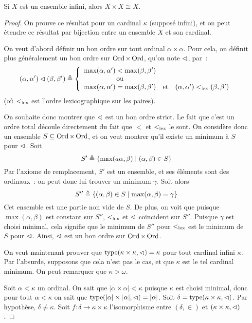 \begin{theorem}
  Si $X$ est un ensemble infini, alors $X\times X \cong X$.
\end{theorem}

\begin{proof}
  On prouve ce résultat pour un cardinal $\kappa$ (supposé infini), et on peut
  étendre ce résultat par bijection entre un ensemble $X$ et son cardinal.

  On veut d'abord définir un bon ordre sur tout ordinal $\alpha \times \alpha$.
  Pour cela, on définit plus généralement un bon ordre sur $\operatorname{Ord}\times\operatorname{Ord}$,
  qu'on note $\lhd$, par~:
  \[(\alpha,\alpha')\lhd(\beta,\beta') \triangleq
  \left\{\begin{array}{ccc}
  \max(\alpha,\alpha') < \max(\beta,\beta') & &\\
  \text{ou} & &\\
  \max(\alpha,\alpha') = \max(\beta,\beta')&\text{et}&
  (\alpha,\alpha')<_{\mathrm{lex}} (\beta,\beta')
  \end{array}\right.\]
  (où $<_{\mathrm{lex}}$ est l'ordre lexicographique sur les paires).

  On souhaite donc montrer que $\lhd$ est un bon ordre strict. Le fait que
  c'est un ordre total découle directement du fait que $<$ et $<_{\mathrm{lex}}$ le sont.
  On considère donc un ensemble $S\subseteq \operatorname{Ord}\times \operatorname{Ord}$, et on veut montrer
  qu'il existe un minimum à $S$ pour $\lhd$. Soit
  \[S'\triangleq \{\max(a\alpha,\beta)\mid (\alpha,\beta) \in S\}\]
  Par l'axiome de remplacement, $S'$ est un ensemble, et ses éléments sont des
  ordinaux~: on peut donc lui trouver un minimum $\gamma$. Soit alors
  \[S'' \triangleq \{(\alpha,\beta) \in S\mid \max(\alpha,\beta) = \gamma\}\]
  Cet ensemble est une partie non vide de $S$. De plus, on voit que puisque
  $\max(\alpha,\beta)$ est constant sur $S''$, $<_{\mathrm{lex}}$ et $\lhd$ coïncident
  sur $S''$. Puisque $\gamma$ est choisi minimal, cela signifie que le minimum
  de $S''$ pour $<_{\mathrm{lex}}$ est le minimum de $S$ pour $\lhd$. Ainsi, $\lhd$
  est un bon ordre sur $\operatorname{Ord}\times \operatorname{Ord}$.

  On veut maintenant prouver que $\operatorname{type}(\kappa\times\kappa,\lhd) = \kappa$
  pour tout cardinal infini $\kappa$. Par l'absurde, supposons que cela n'est
  pas le cas, et que $\kappa$ est le tel cardinal minimum. On peut remarquer que
  $\kappa > \omega$.

  Soit $\alpha < \kappa$ un ordinal. On sait que
  $|\alpha \times \alpha| < \kappa$ puisque $\kappa$ est choisi minimal, donc
  pour tout $\alpha < \kappa$ on sait que
  $\operatorname{type}(|\alpha| \times |\alpha|,\lhd) = |\alpha|$. Soit
  $\delta = \operatorname{type}(\kappa\times\kappa,\lhd)$. Par hypothèse,
  $\delta \neq \kappa$. Soit $f : \delta \to \kappa \times \kappa$
  l'isomorphisme entre $(\delta,\in)$ et $(\kappa\times\kappa,\lhd)$.


\end{proof}

